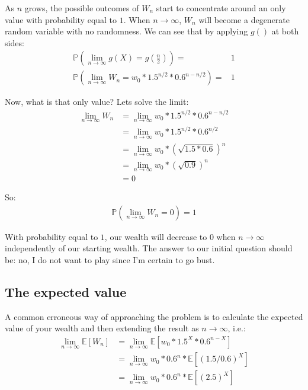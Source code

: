 \documentclass[12pt]{article}
\begin{document}
As $n$ grows, the possible outcomes of $W_n$ start to concentrate around an only value with probability equal to $1$. When $n \rightarrow \infty$, $W_n$ will become a degenerate random variable with no randomness. We can see that by applying $g()$ at both sides:
\begin{equation*}
  \begin{split}
    \mathbb{P}(\lim_{n\to\infty} g(X) = g(\tfrac{n}{2})) =& 1\\
    \mathbb{P}(\lim_{n\to\infty} W_n = w_0 * 1.5^{n/2} * 0.6^{n-n/2}) =& 1
    \end{split}
\end{equation*}

Now, what is that only value? Lets solve the limit:
\begin{equation*}
  \begin{split}
    \lim_{n\to\infty} W_n &= \lim_{n\to\infty} w_0 * 1.5^{n/2} * 0.6^{n-n/2} \\
    & = \lim_{n\to\infty}w_0 * 1.5^{n/2} * 0.6^{n/2} \\
    &= \lim_{n\to\infty}w_0 * (\sqrt{1.5*0.6})^{n}\\
    &= \lim_{n\to\infty}w_0 * (\sqrt{0.9}) ^{n}\\
    &= 0
  \end{split}
\end{equation*}

So:
\begin{align*}
\begin{equation*}
  \mathbb{P}(\lim_{n\to\infty} W_n = 0) = 1
\end{equation*}
\end{align*}
  
With probability equal to $1$, our wealth will decrease to 0 when $n\to\infty$ independently of our starting wealth. The answer to our initial question should be: no, I do not want to play since I'm certain to go bust.

\subsection{The expected value}
A common erroneous way of approaching the problem is to calculate the expected value of your wealth and then extending the result as $n\to\infty$, i.e.:
\begin{equation*}
  \begin{split}
    \lim_{n\to\infty}\mathbb{E}[W_n] &= \lim_{n\to\infty}\mathbb{E}[w_0 * 1.5^X * 0.6^{n-X}]\\
    & = \lim_{n\to\infty} w_0 * 0.6^n * \mathbb{E}[(1.5/0.6)^X]\\
    & = \lim_{n\to\infty} w_0 * 0.6^n * \mathbb{E}[(2.5)^X]
  \end{split}
\end{equation*}
\end{document}

